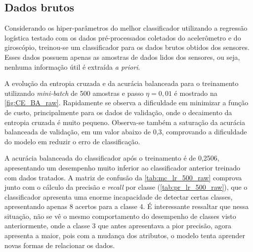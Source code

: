 \subsection{Dados brutos}


Considerando os hiper-parâmetros do melhor classificador utilizando a regressão logística testado com os dados pré-processados coletados do acelerômetro e do giroscópio, treinou-se um classificador para os dados brutos obtidos dos sensores. Esses dados possuem apenas as amostras de dados lidos dos sensores, ou seja, nenhuma informação útil é extraída \textit{a priori}.

A evolução da entropia cruzada e da acurácia balanceada para o treinamento utilizando \textit{mini-batch} de 500 amostras e passo $\eta = 0,01$ é mostrado na \autoref{fig:CE_BA_raw}. Rapidamente se observa a dificuldade em minimizar a função de custo, principalmente para os dados de validação, onde o decaimento da entropia cruzada é muito pequeno. Observa-se também a saturação da acurácia balanceada de validação, em um valor abaixo de 0,3, comprovando a dificuldade do modelo em reduzir o erro de classificação.

A acurácia balanceada do classificador após o treinamento é de 0,2506, apresentando um desempenho muito inferior ao classificador anterior treinado com dados tratados. A matriz de confusão da \autoref{tab:mc_lr_500_raw} comprova junto com o cálculo da precisão e \textit{recall} por classe (\autoref{tab:pr_lr_500_raw}), que o classificador apresenta uma enorme incapacidade de detectar certas classes, apresentando apenas 8 acertos para a classe 4. É interessante ressaltar que nessa situação, não se vê o mesmo comportamento do desempenho de classes visto anteriormente, onde a classe 3 que antes apresentava a pior precisão, agora apresenta a maior, pois com a mudança dos atributos, o modelo tenta aprender novas formas de relacionar os dados.

